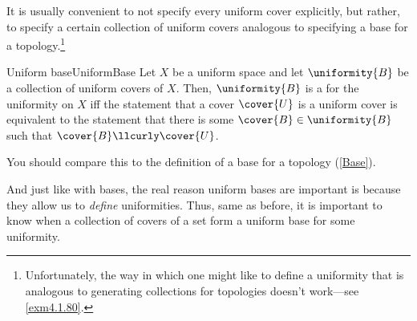 It is usually convenient to not specify every uniform cover explicitly, but rather, to specify a certain collection of uniform covers analogous to specifying a base for a topology.\footnote{Unfortunately, the way in which one might like to define a uniformity that is analogous to generating collections for topologies doesn't work---see \cref{exm4.1.80}.}
\begin{dfn}{Uniform base}{UniformBase}
Let $X$ be a uniform space and let $\uniformity{B}$ be a collection of uniform covers of $X$.  Then, $\uniformity{B}$ is a  for the uniformity on $X$ iff the statement that a cover $\cover{U}$ is a uniform cover is equivalent to the statement that there is some $\cover{B}\in \uniformity{B}$ such that $\cover{B}\llcurly \cover{U}$.
\begin{rmk}
You should compare this to the definition of a base for a topology (\cref{Base}).
\end{rmk}
\end{dfn}
And just like with bases, the real reason uniform bases are important is because they allow us to \emph{define} uniformities.  Thus, same as before, it is important to know when a collection of covers of a set form a uniform base for some uniformity.
